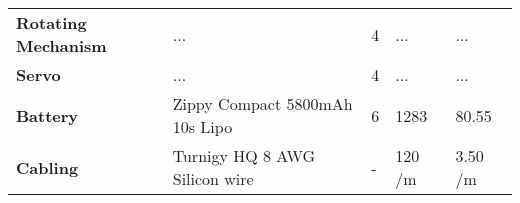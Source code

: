\begin{table}[H]
\begin{tabular}{m{3cm}m{3.2cm}m{0.6cm}m{2.64cm}m{2.64cm}}
    \textbf{Rotating Mechanism}     & ...                                                                       & 4           & ...                        & ...                        \\\hdashline
    \textbf{Servo}              & ...                                                                       & 4           & ...                        & ...                        \\\hdashline
    \textbf{Battery}            & Zippy Compact 5800mAh 10s Lipo                                            & 6           & 1283                       & 80.55
    \\\hdashline
    \textbf{Cabling}            & Turnigy HQ 8 AWG Silicon wire                                             & -           & 120 /m                     & 3.50 /m                 \\ \bottomrule
    \end{tabular}
\end{table}


\begin{comment}
Recommandations???

4) Optional: look into other propulsion types (break with electric prop. requirement):
- Electric VS. Combustion
- Electric VS. Hybrid propulsion
\end{comment}